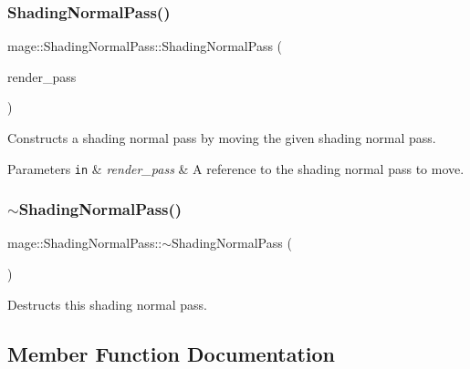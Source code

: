 \subsubsection{\texorpdfstring{Shading\+Normal\+Pass()}{ShadingNormalPass()}\hspace{0.1cm}{\footnotesize\ttfamily [3/3]}}
{\footnotesize\ttfamily mage\+::\+Shading\+Normal\+Pass\+::\+Shading\+Normal\+Pass (\begin{DoxyParamCaption}\item[{\hyperlink{classmage_1_1_shading_normal_pass}{Shading\+Normal\+Pass} \&\&}]{render\+\_\+pass }\end{DoxyParamCaption})\hspace{0.3cm}{\ttfamily [default]}}

Constructs a shading normal pass by moving the given shading normal pass.


\begin{DoxyParams}[1]{Parameters}
\mbox{\tt in}  & {\em render\+\_\+pass} & A reference to the shading normal pass to move. \\
\hline
\end{DoxyParams}
\hypertarget{classmage_1_1_shading_normal_pass_aba7194077210d32dbcbc6cfbf4adba8f}{}\label{classmage_1_1_shading_normal_pass_aba7194077210d32dbcbc6cfbf4adba8f} 
\subsubsection{\texorpdfstring{$\sim$\+Shading\+Normal\+Pass()}{~ShadingNormalPass()}}
{\footnotesize\ttfamily mage\+::\+Shading\+Normal\+Pass\+::$\sim$\+Shading\+Normal\+Pass (\begin{DoxyParamCaption}{ }\end{DoxyParamCaption})\hspace{0.3cm}{\ttfamily [default]}}

Destructs this shading normal pass. 

\subsection{Member Function Documentation}
\hypertarget{classmage_1_1_shading_normal_pass_a49c57b6c8a6aee0678556f25f9c97d11}{}\label{classmage_1_1_shading_normal_pass_a49c57b6c8a6aee0678556f25f9c97d11} 
